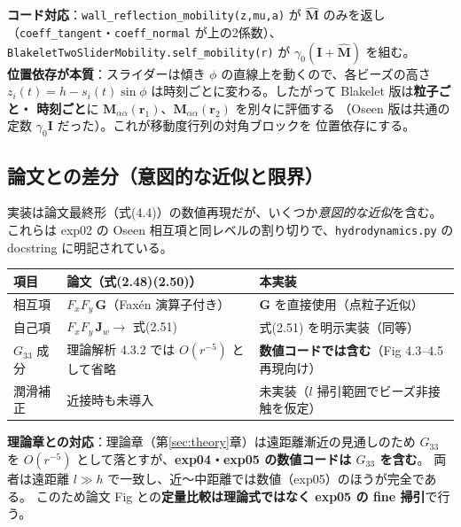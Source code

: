 \documentclass[11pt,a4paper]{article}
\newcommand{\rv}{\bm{r}}
\newcommand{\gamz}{\gamma_{0}}
\begin{document}
\begin{keybox}
\textbf{コード対応}：\texttt{wall\_reflection\_mobility(z,mu,a)} が $\widehat{\bm M}$ のみを返し
（\texttt{coeff\_tangent}・\texttt{coeff\_normal} が上の2係数）、
\texttt{BlakeletTwoSliderMobility.self\_mobility(r)} が $\gamz(\bm I+\widehat{\bm M})$ を組む。\\[2pt]
\textbf{位置依存が本質}：スライダーは傾き $\phi$ の直線上を動くので、各ビーズの高さ
$z_i(t)=h-s_i(t)\sin\phi$ は時刻ごとに変わる。したがって Blakelet 版は\textbf{粒子ごと・
時刻ごと}に $\bm M_{\alpha\alpha}(\rv_1)$、$\bm M_{\alpha\alpha}(\rv_2)$ を別々に評価する
（Oseen 版は共通の定数 $\gamz\bm I$ だった）。これが移動度行列の対角ブロックを
位置依存にする。
\end{keybox}

\subsection{論文との差分（意図的な近似と限界）}\label{sec:blakediff}

実装は論文最終形（式(4.4)）の数値再現だが、いくつか\emph{意図的な近似}を含む。
これらは exp02 の Oseen 相互項と同レベルの割り切りで、\texttt{hydrodynamics.py} の
docstring に明記されている。

\begin{table}[h]
\centering\small
\begin{tabularx}{\linewidth}{l X X}
\toprule
項目 & 論文（式(2.48)(2.50)） & 本実装 \\
\midrule
相互項 & $F_xF_y\,\bm G$（Faxén 演算子付き） & $\bm G$ を直接使用（点粒子近似） \\
自己項 & $F_xF_y\,\bm J_w\to$ 式(2.51) & 式(2.51) を明示実装（同等） \\
$G_{33}$ 成分 & 理論解析 4.3.2 では $O(r^{-5})$ として省略 & \textbf{数値コードでは含む}（Fig 4.3--4.5 再現向け） \\
潤滑補正 & 近接時も未導入 & 未実装（$l$ 掃引範囲でビーズ非接触を仮定） \\
\bottomrule
\end{tabularx}
\end{table}

\begin{keybox}
\textbf{理論章との対応}：理論章（第\ref{sec:theory}章）は遠距離漸近の見通しのため
$G_{33}$ を $O(r^{-5})$ として落とすが、\textbf{exp04・exp05 の数値コードは $G_{33}$ を含む}。
両者は遠距離 $l\gg h$ で一致し、近〜中距離では数値（exp05）のほうが完全である。
このため論文 Fig との\textbf{定量比較は理論式ではなく exp05 の fine 掃引}で行う。
\end{keybox}
\end{document}
